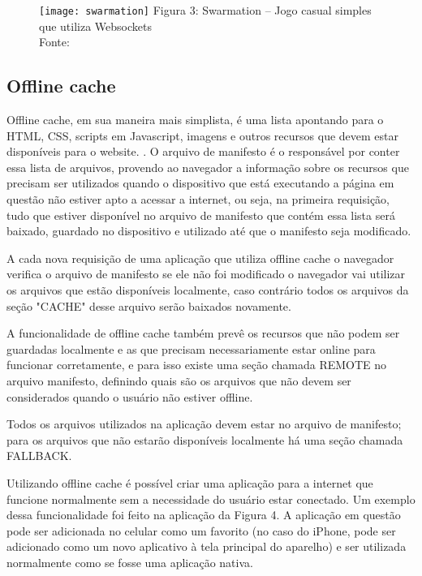 \begin{figure}[H]
  \centering
	\texttt{[image: swarmation]}
	\footnotesize\hspace{8\baselineskip}
	Figura 3: Swarmation {--} Jogo casual simples que utiliza Websockets \\
	Fonte: 
  \label{img:swarmation}
\end{figure}


\subsection{Offline cache}

Offline cache, em sua maneira mais simplista, é uma lista apontando
para o HTML, CSS, scripts em Javascript, imagens e outros recursos que devem
estar disponíveis para o website. \cite{pilgrim2010html5}. O arquivo de
manifesto é o responsável por conter essa lista de arquivos, provendo
ao navegador a informação sobre os recursos que
precisam ser utilizados quando o dispositivo que está executando a
página em questão não estiver apto a acessar a internet, ou seja,
na primeira requisição, tudo que estiver disponível no arquivo de manifesto
que contém essa lista será baixado, guardado no dispositivo e utilizado até
que o manifesto seja modificado.

A cada nova requisição de uma aplicação que utiliza offline cache o
navegador verifica o arquivo de manifesto se ele não foi modificado
o navegador vai utilizar os arquivos que estão disponíveis localmente,
caso contrário todos os arquivos da seção "CACHE" desse arquivo serão baixados novamente.

A funcionalidade de offline cache também prevê os recursos que não
podem ser guardadas localmente e as que precisam
necessariamente estar online para funcionar corretamente, e para isso
existe uma seção chamada REMOTE no arquivo manifesto, definindo quais
são os arquivos que não devem ser considerados quando o usuário não
estiver offline.

Todos os arquivos utilizados na aplicação devem estar no arquivo de
manifesto; para os arquivos que não estarão disponíveis localmente há
uma seção chamada FALLBACK.

Utilizando offline cache é possível criar uma aplicação para a
internet que funcione normalmente sem a necessidade do usuário estar
conectado. Um exemplo dessa funcionalidade foi feito na aplicação da
Figura 4. A aplicação em questão pode ser adicionada
no celular como um favorito (no caso do iPhone, pode ser adicionado
como um novo aplicativo à tela principal do aparelho) e ser utilizada
normalmente como se fosse uma aplicação nativa.

